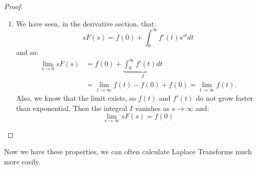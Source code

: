 \documentclass[../Main.tex]{subfiles}
\begin{document}
\begin{proof}
\begin{enumerate}
\begin{align*}
                F'(s) &= \frac{d}{ds} \int_{0}^{\infty} f(t) e^{-st} dt \\
                &= \int_{0}^{\infty} (-t)f(t)e^{-st} dt \\
                &= \LT[-t f(t)]
            \end{align*}
        \item We have seen, in the derivative section, that:
            \begin{equation*}
                sF(s) = f(0) + \int_{0}^{\infty} f'(t) s^{st} dt
            \end{equation*}
            and so:
            \begin{align*}
                \lim_{s \to 0} sF(s) &= f(0) + \underbrace{\int_{0}^{\infty} f'(t) dt}_I \\
                &= \lim_{t \to \infty} f(t) - f(0) + f(0) = \lim_{t \to \infty} f(t).
            \end{align*}
            Also, we know that the limit exists, so $f(t)$ and $f'(t)$ do not grow faster than exponential. Then the integral $I$ vanishes as $s \to \infty$ and:
            \begin{equation*}
                \lim_{s \to \infty}sF(s) = f(0)
            \end{equation*}
    \end{enumerate}
\end{proof}
Now we have these properties, we can often calculate Laplace Transforms much more easily.
\end{document}
